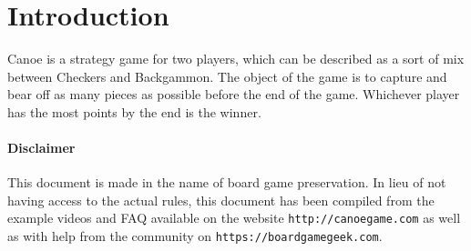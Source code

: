 \section*{Introduction}
Canoe is a strategy game for two players, which can be described as a sort of mix between Checkers and Backgammon.
The object of the game is to capture and bear off as many pieces as possible before the end of the game.
Whichever player has the most points by the end is the winner.

\paragraph*{Disclaimer} This document is made in the name of board game preservation. In lieu of not having access to the actual rules, this document has been compiled from the example videos and FAQ available on the website \texttt{http://canoegame.com} as well as with help from the community on \texttt{https://boardgamegeek.com}.